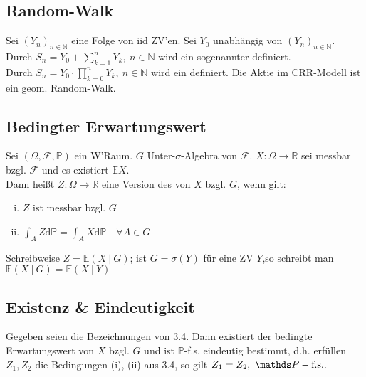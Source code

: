 
\subsection{Random-Walk}
\label{sub:random_walk}
Sei $(Y_n)_{n\in \mathds{N}}$ eine Folge von iid ZV'en. Sei $Y_0$ unabhängig von $(Y_n)_{n\in \mathds{N}}$.\\
Durch $S_n=Y_0+\sum_{k=1}^{n}Y_k,~n\in \mathds{N}$ wird ein sogenannter  definiert.\\
Durch $S_n=Y_0\cdot \prod_{k=0}^{n}Y_k,~n\in \mathds{N}$ wird ein  definiert. Die Aktie im CRR-Modell ist ein geom. Random-Walk.

\newpage
\subsection{Bedingter Erwartungswert}
\label{sub:bed_ew}
Sei $(\Omega,\mathcal{F},\mathds{P})$ ein W'Raum. $G$ Unter-$\sigma$-Algebra von $\mathcal{F}$. $X:\Omega\to \mathds{R}$ sei messbar bzgl. $\mathcal{F}$ und es existiert  $\mathds{E}X$.\\
Dann heißt $Z:\Omega\to\mathds{R}$ eine Version des  von $X$ bzgl. $G$, wenn gilt:\\
\begin{enumerate}[(i)]
	\item $Z$ ist messbar bzgl. $G$
	\item $\int_{A}Z\mathrm{d}\mathds{P}=\int_{A}X\mathrm{d}\mathds{P}\quad \forall A\in G$
\end{enumerate}
Schreibweise $Z=\mathds{E}(X~|~G)$; 
ist $G=\sigma(Y)$ für eine ZV $Y$,so schreibt man $\mathds{E}(X~|~G)=\mathds{E}(X~|~Y)$


\subsection{Existenz \& Eindeutigkeit}
\label{sub:ex&eind}
Gegeben seien die Bezeichnungen von \hyperref[sub:bed_ew]{3.4}. Dann existiert der bedingte Erwartungswert von $X$ bzgl. $G$ und ist $\mathds{P}$-f.s. eindeutig bestimmt, d.h. erfüllen $Z_1,Z_2$ die Bedingungen (i), (ii) aus 3.4, so gilt $Z_1=Z_2,~\pfs$.\\

